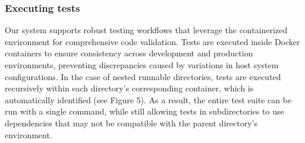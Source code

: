 \subsubsection{Executing tests}

Our system supports robust testing workflows that leverage the
containerized environment for comprehensive code validation. Tests are
executed inside Docker containers to ensure consistency across development
and production environments, preventing discrepancies caused by
variations in host system configurations. In the case of nested runnable
directories, tests are executed recursively within each directory's
corresponding container, which is automatically identified (see Figure
5). As a result, the entire test suite can be run with a single command,
while still allowing tests in subdirectories to use dependencies that
may not be compatible with the parent directory's environment.


